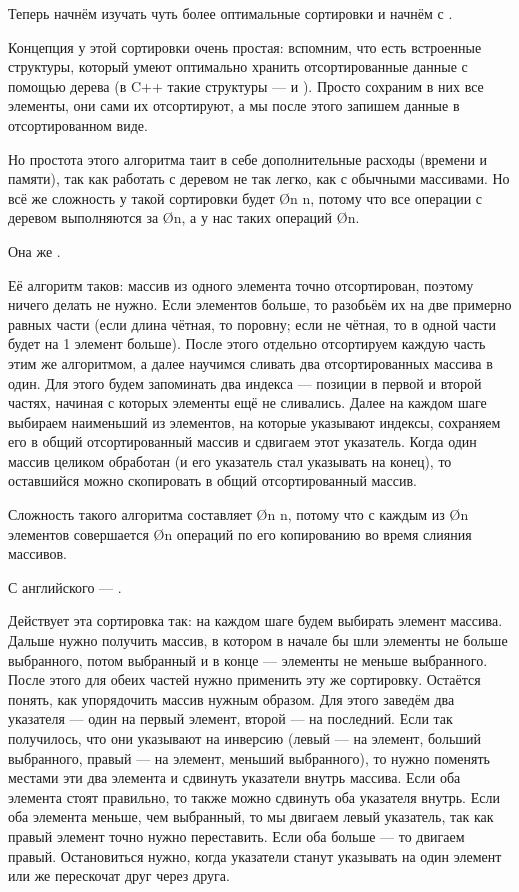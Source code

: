 Теперь начнём изучать чуть более оптимальные сортировки и начнём с .

Концепция у этой сортировки очень простая: вспомним, что есть встроенные структуры, который умеют оптимально хранить отсортированные данные с помощью дерева (в C++ такие структуры —  и ). Просто сохраним в них все элементы, они сами их отсортируют, а мы после этого запишем данные в отсортированном виде.

Но простота этого алгоритма таит в себе дополнительные расходы (времени и памяти), так как работать с деревом не так легко, как с обычными массивами. Но всё же сложность у такой сортировки будет \O{n \log n}, потому что все операции с деревом выполняются за \O{\log n}, а у нас таких операций \O{n}.

Она же .

Её алгоритм таков: массив из одного элемента точно отсортирован, поэтому ничего делать не нужно. Если элементов больше, то разобьём их на две примерно равных части (если длина чётная, то поровну; если не чётная, то в одной части будет на 1 элемент больше). После этого отдельно отсортируем каждую часть этим же алгоритмом, а далее научимся сливать два отсортированных массива в один. Для этого будем запоминать два индекса — позиции в первой и второй частях, начиная с которых элементы ещё не сливались. Далее на каждом шаге выбираем наименьший из элементов, на которые указывают индексы, сохраняем его в общий отсортированный массив и сдвигаем этот указатель. Когда один массив целиком обработан (и его указатель стал указывать на конец), то оставшийся можно скопировать в общий отсортированный массив.

Сложность такого алгоритма составляет \O{n \log n}, потому что с каждым из \O{n} элементов совершается \O{\log n} операций по его копированию во время слияния массивов.

С английского — .

Действует эта сортировка так: на каждом шаге будем выбирать элемент массива. Дальше нужно получить массив, в котором в начале бы шли элементы не больше выбранного, потом выбранный и в конце — элементы не меньше выбранного. После этого для обеих частей нужно применить эту же сортировку. Остаётся понять, как упорядочить массив нужным образом. Для этого заведём два указателя — один на первый элемент, второй — на последний. Если так получилось, что они указывают на инверсию (левый — на элемент, больший выбранного, правый — на элемент, меньший выбранного), то нужно поменять местами эти два элемента и сдвинуть указатели внутрь массива. Если оба элемента стоят правильно, то также можно сдвинуть оба указателя внутрь. Если оба элемента меньше, чем выбранный, то мы двигаем левый указатель, так как правый элемент точно нужно переставить. Если оба больше — то двигаем правый. Остановиться нужно, когда указатели станут указывать на один элемент или же перескочат друг через друга.

